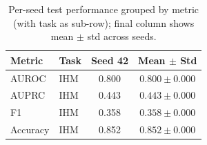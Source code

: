 \begin{table}[h]
\centering
\small
\begin{tabular}{ll|c|c}
\hline
Metric & Task & Seed 42 & Mean $\pm$ Std \\
\hline
AUROC & IHM & 0.800 & $0.800 \pm 0.000$ \\
\hline
AUPRC & IHM & 0.443 & $0.443 \pm 0.000$ \\
\hline
F1 & IHM & 0.358 & $0.358 \pm 0.000$ \\
\hline
Accuracy & IHM & 0.852 & $0.852 \pm 0.000$ \\
\hline
\end{tabular}
\caption{Per-seed test performance grouped by metric (with task as sub-row); final column shows mean $\pm$ std across seeds.}
\end{table}
